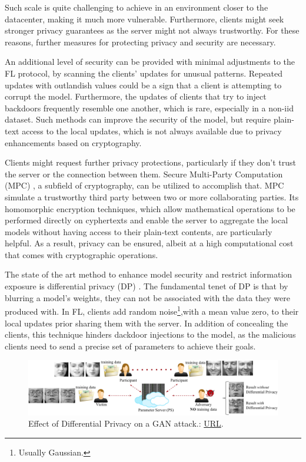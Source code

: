 Such scale is quite challenging to achieve in an environment closer to the datacenter, making it much more vulnerable. Furthermore, clients might seek stronger privacy guarantees as the server might not always trustworthy. For these reasons, further measures for protecting privacy and security are necessary.

An additional level of security can be provided with minimal adjustments to the FL protocol, by scanning the clients' updates for unusual patterns. Repeated updates with outlandish values could be a sign that a client is attempting to corrupt the model. Furthermore, the updates of clients that try to inject backdoors frequently resemble one another, which is rare, especially in a non-iid dataset. Such methods can improve the security of the model, but require plain-text access to the local updates, which is not always available due to privacy enhancements based on cryptography.

Clients might request further privacy protections, particularly if they don't trust the server or the connection between them. Secure Multi-Party Computation (MPC) \cite{MPC}, a subfield of cryptography, can be utilized to accomplish that. MPC simulate a trustworthy third party between two or more collaborating parties. Its homomorphic encryption techniques, which allow mathematical operations to be performed directly on cyphertexts and enable the server to aggregate the local models without having access to their plain-text contents, are particularly helpful. As a result, privacy can be ensured, albeit at a high computational cost that comes with cryptographic operations.

The state of the art method to enhance model security and restrict information exposure is differential privacy (DP) \cite{GAN_attack}. The fundamental tenet of DP is that by blurring a model's weights, they can not be associated with the data they were produced with. In FL, clients add random noise\footnote{Usually Gaussian.},with a mean value zero, to their local updates prior sharing them with the server. In addition of concealing the clients, this technique hinders dackdoor injections to the model, as the malicious clients need to send a precise set of parameters to achieve their goals.


\begin{figure}[H]
    \centering
        \includegraphics[width=1\textwidth]{Images/topologies/dp_on_gan_attack.png}
        \decoRule
        \caption[GAN attack under Differential Privacy]{Effect of Differential Privacy on a GAN attack.: \href{https://arxiv.org/abs/1702.07464}{URL}.}
        \label{fig:GAN attack under Differential Privacy}
\end{figure}

